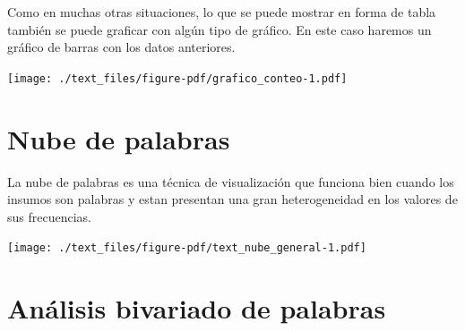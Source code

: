 \documentclass[
  letterpaper,
  DIV=11,
  numbers=noendperiod]{scrreprt}
\begin{document}
Como en muchas otras situaciones, lo que se puede mostrar en forma de
tabla también se puede graficar con algún tipo de gráfico. En este caso
haremos un gráfico de barras con los datos anteriores.

\texttt{[image: ./text\_files/figure-pdf/grafico\_conteo-1.pdf]}

\hypertarget{nube-de-palabras}{%
\section{Nube de palabras}\label{nube-de-palabras}}

La nube de palabras es una técnica de visualización que funciona bien
cuando los insumos son palabras y estan presentan una gran
heterogeneidad en los valores de sus frecuencias.

\texttt{[image: ./text\_files/figure-pdf/text\_nube\_general-1.pdf]}

\hypertarget{anuxe1lisis-bivariado-de-palabras}{%
\section{Análisis bivariado de
palabras}\label{anuxe1lisis-bivariado-de-palabras}}
\end{document}
